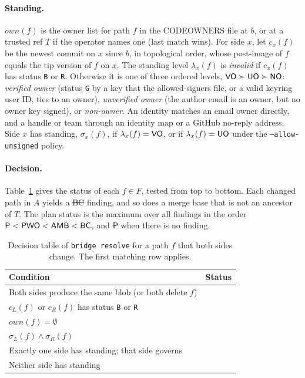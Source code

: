 \paragraph{Standing.} $\mathit{own}(f)$ is the owner list for path $f$ in the CODEOWNERS file at $b$, or at a trusted ref $T$ if the operator names one (last match wins). For side $x$, let $c_x(f)$ be the newest commit on $x$ since $b$, in topological order, whose post-image of $f$ equals the tip version of $f$ on $x$. The standing level $\lambda_x(f)$ is \emph{invalid} if $c_x(f)$ has status \texttt{B} or \texttt{R}. Otherwise it is one of three ordered levels, $\textsf{VO} \succ \textsf{UO} \succ \textsf{NO}$: \emph{verified owner} (status \texttt{G} by a key that the allowed-signers file, or a valid keyring user ID, ties to an owner), \emph{unverified owner} (the author email is an owner, but no owner key signed), or \emph{non-owner}. An identity matches an email owner directly, and a handle or team through an identity map or a GitHub no-reply address. Side $x$ has standing, $\sigma_x(f)$, if $\lambda_x(f) = \textsf{VO}$, or if $\lambda_x(f) = \textsf{UO}$ under the \texttt{--allow-unsigned} policy.

\paragraph{Decision.} Table~\ref{tab:git-decision} gives the status of each $f \in F$, tested from top to bottom. Each changed path in $A$ yields a \st{BC} finding, and so does a merge base that is not an ancestor of $T$. The plan status is the maximum over all findings in the order $\textsf{P} < \textsf{PWO} < \textsf{AMB} < \textsf{BC}$, and \st{P} when there is no finding.

\begin{table}[t]
\caption{Decision table of \texttt{bridge resolve} for a path $f$ that both sides change. The first matching row applies.}
\label{tab:git-decision}
\footnotesize
\begin{tabularx}{\columnwidth}{@{}Xl@{}}
\toprule
Condition & Status \\
\midrule
Both sides produce the same blob (or both delete $f$) & \sP{} \\
$c_L(f)$ or $c_R(f)$ has status \texttt{B} or \texttt{R} & \sBC{} \\
$\mathit{own}(f) = \emptyset$ & \sAMB{} \\
$\sigma_L(f) \land \sigma_R(f)$ & \sAMB{} \\
Exactly one side has standing; that side governs & \sPWO{} \\
Neither side has standing & \sBC{} \\
\bottomrule
\end{tabularx}
\end{table}

